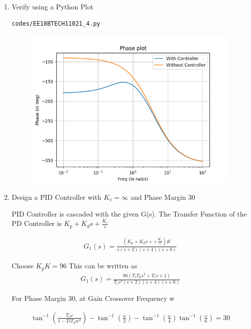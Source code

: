 \begin{enumerate}[label=\thesection.\arabic*.,ref=\thesection.\theenumi]
\item
Verify using a Python Plot

\solution
\begin{lstlisting}
codes/EE18BTECH11021_4.py
\end{lstlisting}

\begin{figure}
\centering
\includegraphics[width=\columnwidth]{figs/EE18BTECH11021_PI.png}
\end{figure}

\item
Design a PID Controller with $K_{v} = \infty$ and Phase Margin 30\degree

\solution
PID Controller is cascaded with the given G(s).
The Transfer Function of the PD Controller is $K_{p} + K_{d}s + \frac{K_{i}}{s}$

\begin{align}
    G_{1}(s) = \frac{(K_{p}+ K_{d}s + +\frac{K_{i}}{s})K}{s(s+2)(s+4)(s+6)}
\end{align}

Choose $K_{p}K = 96$
This can be written as
\begin{align}
    G_{1}(s) = \frac{96(T_{i}T_{d}s^2 + T_{i}s +  1)}{T_{i}s^2(s+2)(s+4)(s+6)}
\end{align}

For Phase Margin 30\degree, at Gain Crossover Frequency w

\begin{align}
    \tan^{-1}(\frac{T_{i}\omega}{1-T{i}T_{d}w^2}) - \tan^{-1}(\frac{\omega}{2}) - \tan^{-1}(\frac{\omega}{4})
    \tan^{-1}(\frac{\omega}{6}) = 30
\end{align}


\end{enumerate}
